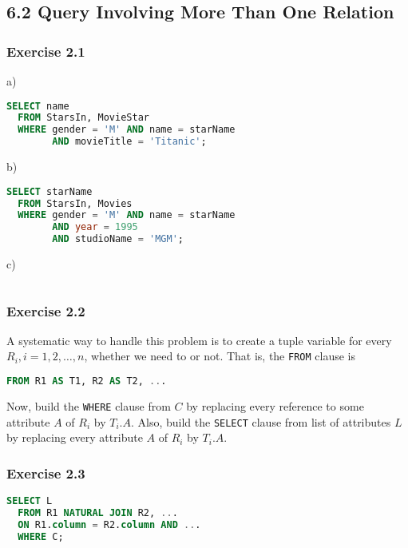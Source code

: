 \subsection*{6.2 Query Involving More Than One Relation}

\subsubsection*{Exercise 2.1}

a)

\begin{lstlisting}[language=sql]
  SELECT name
  FROM StarsIn, MovieStar
  WHERE gender = 'M' AND name = starName
        AND movieTitle = 'Titanic';
\end{lstlisting}

b)

\begin{lstlisting}[language=sql]
  SELECT starName
  FROM StarsIn, Movies
  WHERE gender = 'M' AND name = starName
        AND year = 1995
        AND studioName = 'MGM';
\end{lstlisting}

c)

\begin{lstlisting}[language=sql]

\end{lstlisting}

\subsubsection*{Exercise 2.2}

A systematic way to handle this problem is to create
a tuple variable for every $R_{i}, i = 1,2,\dots,n$,
whether we need to or not. That is, the \verb|FROM|
clause is

\begin{lstlisting}[language=sql]
  FROM R1 AS T1, R2 AS T2, ...
\end{lstlisting}

Now, build the \verb|WHERE| clause from $C$ by
replacing every reference to some attribute $A$
of $R_{i}$ by $T_{i}.A$. Also, build the
\verb|SELECT| clause from list of attributes $L$
by replacing every attribute $A$ of $R_{i}$ by
$T_{i}.A$.

\subsubsection*{Exercise 2.3}

\begin{lstlisting}[language=sql]
  SELECT L
  FROM R1 NATURAL JOIN R2, ...
  ON R1.column = R2.column AND ...
  WHERE C;
\end{lstlisting}
